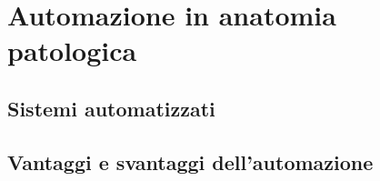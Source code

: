 \chapter{Automazione in anatomia patologica}

\section{Sistemi automatizzati}

\section{Vantaggi e svantaggi dell’automazione}
